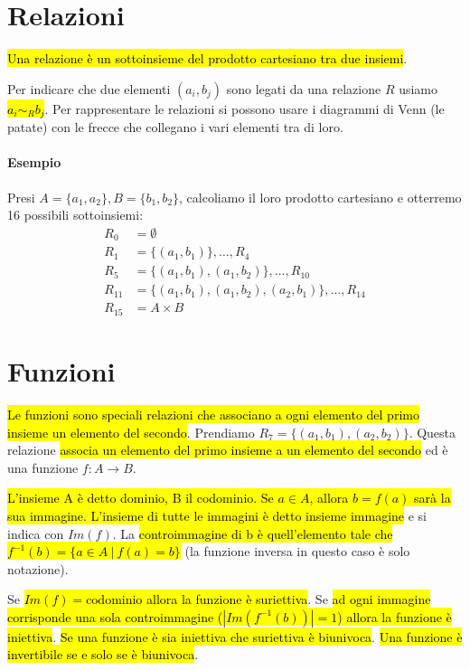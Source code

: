 \documentclass[a4paper,12pt,oneside]{article}
\begin{document}
\section{Relazioni}
\hl{Una relazione è un sottoinsieme del prodotto cartesiano tra due insiemi}.

Per indicare che due elementi $(a_i, b_j)$ sono legati da una relazione
$R$ usiamo \hl{$a_i \sim_R b_j$}. Per rappresentare le relazioni si possono usare i 
diagrammi di Venn (le patate) con le frecce che collegano i vari elementi tra di
loro.

\paragraph{Esempio} Presi $A = \{a_1, a_2\}, B = \{b_1, b_2\}$, calcoliamo il 
loro prodotto cartesiano e otterremo 16 possibili sottoinsiemi:
\begin{align*}
    R_0 &= \emptyset \\
    R_1 &= \{(a_1, b_1)\}, \dots, R_4 \\
    R_5 &= \{(a_1, b_1), (a_1, b_2)\}, \dots, R_10 \\
    R_{11} &= \{(a_1, b_1), (a_1, b_2), (a_2, b_1)\}, \dots, R_14 \\
    R_{15} &= A \times B
\end{align*}



\section{Funzioni}
\hl{Le funzioni sono speciali relazioni che associano a ogni elemento del 
primo insieme un elemento del secondo}. Prendiamo
$R_7 = \{(a_1, b_1), (a_2, b_2)\}$. Questa relazione \hl{associa un elemento
del primo insieme a un elemento del secondo} ed è una funzione $f: A \to B$.

\hl{L'insieme A è detto dominio, B il codominio. Se $a \in A$, allora
$b = f(a)$ sarà la sua immagine. L'insieme di tutte le immagini
è detto insieme immagine} e si indica con $Im(f)$. La \hl{controimmagine di b è
quell'elemento tale che $f^{-1}(b) = \{ a \in A \: | \: f(a) = b \}$} (la funzione
inversa in questo caso è solo notazione).

Se \hl{$Im(f) = \text{codominio}$ allora la funzione è suriettiva}.
Se \hl{ad ogni immagine corrisponde una sola controimmagine ($|Im(f^{-1}(b))| = 1$)
allora la funzione è iniettiva}. \hl{Se una funzione è sia iniettiva
che suriettiva è biunivoca}. \hl{Una funzione è invertibile se e solo se
è biunivoca}.
\end{document}
